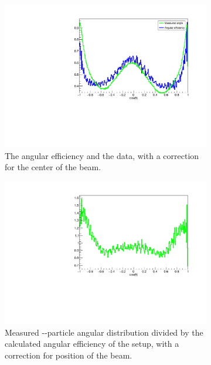 \begin{figure}[h]
	\begin{subfigure}[t]{.48\linewidth}
		\centering
		\includegraphics[width=\linewidth]{../figures/betaAngles/centerCorrectedAndData.pdf}
		\caption{The angular efficiency and the data, with a correction for the center of the beam. }
		\label{fig:centerCorrection}
	\end{subfigure}\hfill
	\begin{subfigure}[t]{.48\linewidth}
		\centering
		\includegraphics[width=\linewidth]{../figures/betaAngles/dataDivEffCenterCorrected.pdf}
		\caption{Measured \be-\al-particle angular distribution divided by the calculated angular efficiency of the setup, with a correction for position of the beam. }
		\label{fig:dataDivEffCenter}
	\end{subfigure}
\caption{}
\end{figure}

